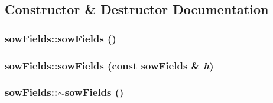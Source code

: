 \subsection{Constructor \& Destructor Documentation}
\hypertarget{classsow_fields_a592f7678b68952373a34f62af314e106}{
\subsubsection[{sowFields}]{\setlength{\rightskip}{0pt plus 5cm}sowFields::sowFields ()}}
\label{classsow_fields_a592f7678b68952373a34f62af314e106}
\hypertarget{classsow_fields_aa34fa84a5007d906736a0e46ffe43afd}{
\subsubsection[{sowFields}]{\setlength{\rightskip}{0pt plus 5cm}sowFields::sowFields (const {\bf sowFields} \& {\em h})}}
\label{classsow_fields_aa34fa84a5007d906736a0e46ffe43afd}
\hypertarget{classsow_fields_ad19e5077dfd928f45b9f190ec273736f}{
\subsubsection[{$\sim$sowFields}]{\setlength{\rightskip}{0pt plus 5cm}sowFields::$\sim$sowFields ()}}
\label{classsow_fields_ad19e5077dfd928f45b9f190ec273736f}


